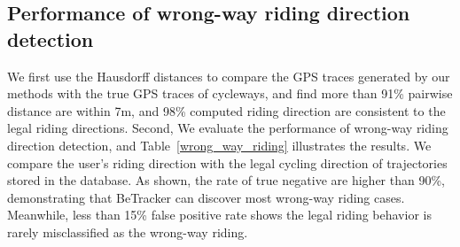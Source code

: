 \documentclass{sigchi-ext}
\def\sysname{BeTracker }
\begin{document}
\subsection{Performance of wrong-way riding direction detection}
We first use the Hausdorff distances to compare the GPS traces generated by our methods with the true GPS traces of cycleways, and find more than 91\% pairwise distance are within 7m, and 98\% computed riding direction are consistent to the legal riding directions.  
Second,  We  evaluate the  performance of wrong-way riding direction detection, and  Table~\ref{wrong_way_riding} illustrates the results. 
We compare the user's riding direction with the legal cycling direction of trajectories stored in the database.  
As shown, the rate of true negative are higher than 90\%, demonstrating that \sysname can discover most wrong-way riding cases. Meanwhile, less than 15\% false positive rate shows the legal riding behavior is rarely misclassified as the wrong-way riding.  

\end{document}
